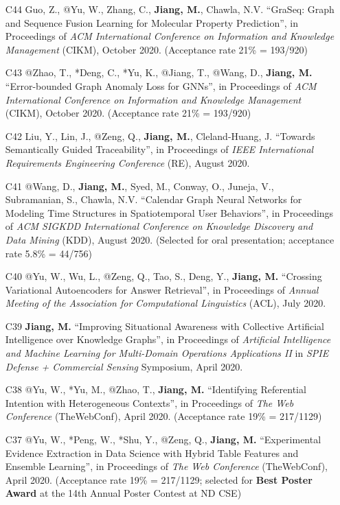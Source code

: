 \documentclass[10pt]{article}
\newenvironment{myindentpar}[1]%
{\begin{list}{}%
         {\setlength{\leftmargin}{#1}}%
         \item[]%
}
{\end{list}}
\newcounter{list}
\begin{document}
\begin{myindentpar}{0.00cm}
\begin{enumerate}[leftmargin=.5cm]
\item[C44] Guo, Z., @Yu, W., Zhang, C., \textbf{Jiang, M.}, Chawla, N.V. ``GraSeq: Graph and Sequence Fusion Learning for Molecular Property Prediction'', in Proceedings of \textit{ACM International Conference on Information and Knowledge Management} (CIKM), October 2020. (Acceptance rate 21\% = 193/920)
		
\item[C43] @Zhao, T., *Deng, C., *Yu, K., @Jiang, T., @Wang, D., \textbf{Jiang, M.} ``Error-bounded Graph Anomaly Loss for GNNs'', in Proceedings of \textit{ACM International Conference on Information and Knowledge Management} (CIKM), October 2020. (Acceptance rate 21\% = 193/920)

\item[C42] Liu, Y., Lin, J., @Zeng, Q., \textbf{Jiang, M.}, Cleland-Huang, J. ``Towards Semantically Guided Traceability'', in Proceedings of \textit{IEEE International Requirements Engineering Conference} (RE), August 2020.	

\item[C41] @Wang, D., \textbf{Jiang, M.}, Syed, M., Conway, O., Juneja, V., Subramanian, S., Chawla, N.V. ``Calendar Graph Neural Networks for Modeling Time Structures in Spatiotemporal User Behaviors'', in Proceedings of \textit{ACM SIGKDD International Conference on Knowledge Discovery and Data Mining} (KDD), August 2020. (Selected for oral presentation; acceptance rate 5.8\% = 44/756)

\item[C40] @Yu, W., Wu, L., @Zeng, Q., Tao, S., Deng, Y., \textbf{Jiang, M.} ``Crossing Variational Autoencoders for Answer Retrieval'', in Proceedings of \textit{Annual Meeting of the Association for Computational Linguistics} (ACL), July 2020.

\item[C39] \textbf{Jiang, M.} ``Improving Situational Awareness with Collective Artificial Intelligence over Knowledge Graphs'', in Proceedings of \textit{Artificial Intelligence and Machine Learning for Multi-Domain Operations Applications II} in \textit{SPIE Defense + Commercial Sensing} Symposium, April 2020.

\item[C38] @Yu, W., *Yu, M., @Zhao, T., \textbf{Jiang, M.} ``Identifying Referential Intention with Heterogeneous Contexts'', in Proceedings of \textit{The Web Conference} (TheWebConf), April 2020. (Acceptance rate 19\% = 217/1129)

\item[C37] @Yu, W., *Peng, W., *Shu, Y., @Zeng, Q., \textbf{Jiang, M.} ``Experimental Evidence Extraction in Data Science with Hybrid Table Features and Ensemble Learning'', in Proceedings of \textit{The Web Conference} (TheWebConf), April 2020. (Acceptance rate 19\% = 217/1129; selected for \textbf{Best Poster Award} at the 14th Annual Poster Contest at ND CSE)


\end{enumerate}
\end{myindentpar}
\end{document}
